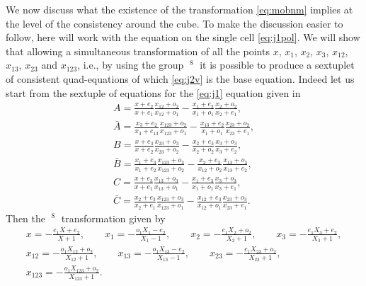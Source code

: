 \documentclass[pdftex]{sigma}
\numberwithin{equation}{section}
\DeclareMathOperator{\Mob}{M\ddot{o}b}
\begin{document}
We now discuss what the existence of the transformation
\eqref{eq:mobnm} implies at the level of the consistency around the
cube.
To make the discussion easier to follow, here will work with
the equation on the single cell \eqref{eq:j1pol}.
We will show
that allowing a simultaneous transformation of all the points
$x$, $x_{1}$, $x_{2}$, $x_{3}$, $x_{12}$, $x_{13}$, $x_{23}$
and $x_{123}$, i.e., by using the group $\Mob^{8}$
it is possible to produce a sextuplet of consistent quad-equations
of which \eqref{eq:j2v} is the base equation.
Indeed let us start from the sextuple of equations for the
\eqref{eq:j1} equation given in~\cite{Hietarinta2004}
\begin{subequations} \label{eq:j1hietsystem}
 \begin{gather}
 A = \frac{x+e_{2}}{x+e_{1}}\frac{x_{12}+o_{2}}{x_{12}+o_{1}} -
 \frac{x_{1}+e_{2}}{x_{1}+o_{1}}\frac{x_{2}+o_{2}}{x_{2}+e_{1}}, \label{eq:j1hietA} \\
 \bar{A} = \frac{x_{3}+e_{2}}{x_{3}+e_{13}}\frac{x_{123}+o_{2}}{x_{123}+o_{1}} -
 \frac{x_{13}+e_{2}}{x_{1}+o_{1}}\frac{x_{23}+o_{2}}{x_{23}+e_{1}}, \label{eq:j1hietAt} \\
 B = \frac{x+e_{3}}{x+e_{2}}\frac{x_{23}+o_{3}}{x_{23}+o_{2}} -
 \frac{x_{2}+e_{3}}{x_{2}+o_{2}}\frac{x_{3}+o_{3}}{x_{3}+e_{2}}, \label{eq:j1hietB} \\
 \bar{B} = \frac{x_{1}+e_{3}}{x_{1}+e_{2}}\frac{x_{123}+o_{3}}{x_{123}+o_{2}} -
 \frac{x_{2}+e_{3}}{x_{12}+o_{2}}\frac{x_{13}+o_{3}}{x_{13}+e_{2}}, \label{eq:j1hietBt} \\
 C = \frac{x+e_{3}}{x+e_{1}}\frac{x_{13}+o_{3}}{x_{13}+o_{1}} -
 \frac{x_{1}+e_{3}}{x_{1}+o_{1}}\frac{x_{3}+o_{3}}{x_{3}+e_{1}}, \label{eq:j1hietC} \\
 \bar{C} = \frac{x_{2}+e_{3}}{x_{2}+e_{1}}\frac{x_{123}+o_{3}}{x_{123}+o_{1}} -
 \frac{x_{12}+e_{3}}{x_{12}+o_{1}}\frac{x_{23}+o_{3}}{x_{23}+e_{1}}. \label{eq:j1hietCt}
 \end{gather}
\end{subequations}
Then the $\Mob^{8}$ transformation given by
\begin{gather}
 x = -\frac{e_{1} X +e_{2}}{X+1},
 \qquad
 x_{1} = -\frac{o_{1} X_{1} -e_{2}}{X_{1}-1},
 \qquad
 x_{2} = -\frac{e_{1} X_{2}+o_{2}}{X_{2}+1},
 \qquad
 x_{3} = -\frac{e_{1} X_{3}+e_{2}}{X_3+1},
 \nonumber\\
 x_{12} = -\frac{o_{1} X_{12} +o_{2}}{X_{12}+1},
 \qquad
 x_{13} = -\frac{o_{1} X_{13}-e_{2}}{X_{13}-1},
\qquad
 x_{23} = -\frac{e_{1} X_{23}+o_{2}}{X_{23}+1},
 \nonumber\\
 x_{123} = -\frac{o_{1} X_{123}+o_{2}}{X_{123}+1}. \label{eq:mob8}
\end{gather}
\end{document}
